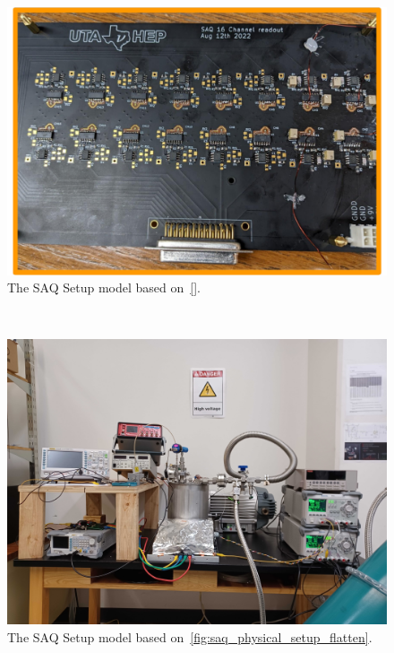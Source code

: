 \begin{figure}[]
\centering
\includegraphics[width=\textwidth]{images/SAQ_16_ivc_readout_board.pdf}
\caption{The SAQ Setup model based on~\ref{}.}
\end{figure}~\label{fig:saq_readout_board}

\begin{figure}[]
\centering
\includegraphics[width=\textwidth]{images/SAQ_physical_setup.jpg}
\caption{The SAQ Setup model based on~\ref{fig:saq_physical_setup_flatten}.}
\end{figure}~\label{fig:saq_setup_flatten}

